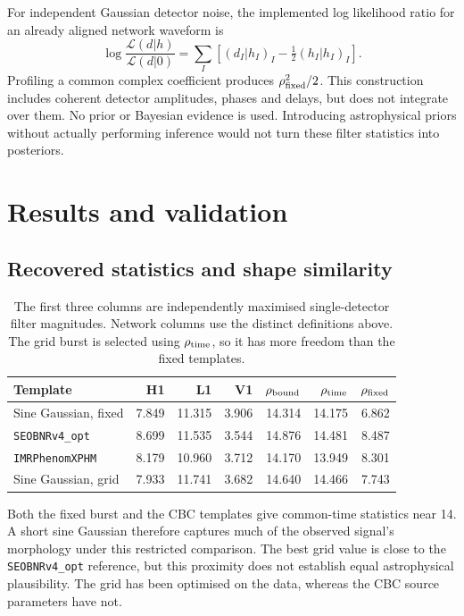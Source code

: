 \documentclass[11pt,a4paper]{article}
\begin{document}
For independent Gaussian detector noise, the implemented log likelihood ratio for an already aligned network waveform is
\begin{equation}
 \log\frac{\mathcal L(d|h)}{\mathcal L(d|0)}=
 \sum_I\left[(d_I|h_I)_I-\tfrac12(h_I|h_I)_I\right].
\end{equation}
Profiling a common complex coefficient produces $\rho_{\rm fixed}^2/2$. This construction includes coherent detector amplitudes, phases and delays, but does not integrate over them. No prior or Bayesian evidence is used. Introducing astrophysical priors without actually performing inference would not turn these filter statistics into posteriors.

\section{Results and validation}
\subsection{Recovered statistics and shape similarity}
\begin{table}[ht]
\centering\small\setlength{\tabcolsep}{4pt}
\begin{tabular}{lrrrrrr}
\toprule
Template & H1 & L1 & V1 & $\rho_{\rm bound}$ & $\rho_{\rm time}$ & $\rho_{\rm fixed}$\\
\midrule
Sine Gaussian, fixed & 7.849 & 11.315 & 3.906 & 14.314 & 14.175 & 6.862 \\
\texttt{SEOBNRv4\_opt} & 8.699 & 11.535 & 3.544 & 14.876 & 14.481 & 8.487 \\
\texttt{IMRPhenomXPHM} & 8.179 & 10.960 & 3.712 & 14.170 & 13.949 & 8.301 \\
Sine Gaussian, grid & 7.933 & 11.741 & 3.682 & 14.640 & 14.466 & 7.743 \\
\bottomrule
\end{tabular}
\caption{The first three columns are independently maximised single-detector filter magnitudes. Network columns use the distinct definitions above. The grid burst is selected using $\rho_{\rm time}$, so it has more freedom than the fixed templates.}
\label{tab:snr}
\end{table}

Both the fixed burst and the CBC templates give common-time statistics near 14. A short sine Gaussian therefore captures much of the observed signal's morphology under this restricted comparison. The best grid value is close to the \texttt{SEOBNRv4\_opt} reference, but this proximity does not establish equal astrophysical plausibility. The grid has been optimised on the data, whereas the CBC source parameters have not.
\end{document}
